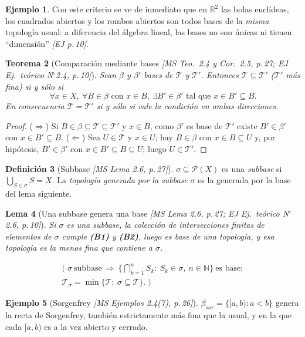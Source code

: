\documentclass[11pt,a4paper]{article}
\newcommand{\lgc}[1]{\par\vspace{-3pt}\begin{gather*}\big(\;#1\;\big)\end{gather*}\vspace{-6pt}}
\theoremstyle{definition}
\newtheorem{definicion}{Definición}[section]
\newtheorem{ejemplo}[definicion]{Ejemplo}
\theoremstyle{plain}
\newtheorem{teorema}[definicion]{Teorema}
\newtheorem{lema}[definicion]{Lema}
\newcommand{\fnt}[1]{{\normalfont\small\itshape\color{gray!150!black}[#1]}}
\newcommand{\R}{\mathbb{R}}
\newcommand{\N}{\mathbb{N}}
\newcommand{\tp}{\mathcal{T}}
\begin{document}
\begin{ejemplo}
Con este criterio se ve de inmediato que en $\R^2$ las bolas euclídeas, los cuadrados abiertos y los rombos abiertos son todos bases de la \emph{misma} topología usual: a diferencia del álgebra lineal, las bases no son únicas ni tienen ``dimensión'' \fnt{EJ p.\,10}.
\end{ejemplo}

\begin{teorema}[Comparación mediante bases \fnt{MS Teo.\ 2.4 y Cor.\ 2.5, p.\,27; EJ Ej.\ teórico N$^\circ$2.4, p.\,10}]\label{th:compbase}
Sean $\beta$ y $\beta'$ bases de $\tp$ y $\tp'$. Entonces $\tp\subseteq\tp'$ ($\tp'$ más fina) si y sólo si
\[
\forall x\in X,\ \forall B\in\beta \text{ con } x\in B,\ \exists B'\in\beta' \text{ tal que } x\in B'\subseteq B .
\]
En consecuencia $\tp=\tp'$ si y sólo si vale la condición en ambas direcciones.
\end{teorema}

\begin{proof}
($\Rightarrow$) Si $B\in\beta\subseteq\tp\subseteq\tp'$ y $x\in B$, como $\beta'$ es base de $\tp'$ existe $B'\in\beta'$ con $x\in B'\subseteq B$. ($\Leftarrow$) Sea $U\in\tp$ y $x\in U$; hay $B\in\beta$ con $x\in B\subseteq U$ y, por hipótesis, $B'\in\beta'$ con $x\in B'\subseteq B\subseteq U$; luego $U\in\tp'$.
\end{proof}

\begin{definicion}[Subbase \fnt{MS Lema 2.6, p.\,27}]
$\sigma\subseteq\mathcal P(X)$ es una \emph{subbase} si $\bigcup_{S\in\sigma}S=X$. La \emph{topología generada por la subbase} $\sigma$ es la generada por la base del lema siguiente.
\end{definicion}

\begin{lema}[Una subbase genera una base \fnt{MS Lema 2.6, p.\,27; EJ Ej.\ teórico N$^\circ$2.6, p.\,10}]
Si $\sigma$ es una subbase, la colección de \emph{intersecciones finitas} de elementos de $\sigma$ cumple \textbf{(B1)} y \textbf{(B2)}, luego es base de una topología, y esa topología es la menos fina que contiene a $\sigma$.
\lgc{\sigma\ \text{subbase}\ \Rightarrow\ \Big\{\bigcap_{k=1}^{n}S_k:\ S_k\in\sigma,\ n\in\N\Big\}\ \text{es base};\\
\tp_\sigma=\min\{\tp:\ \sigma\subseteq\tp\}.}
\end{lema}


\begin{ejemplo}[Sorgenfrey \fnt{MS Ejemplos 2.4(7), p.\,26}]
$\beta_{sor}=\{[a,b): a<b\}$ genera la recta de Sorgenfrey, también estrictamente más fina que la usual, y en la que cada $[a,b)$ es a la vez abierto y cerrado.
\end{ejemplo}
\end{document}
